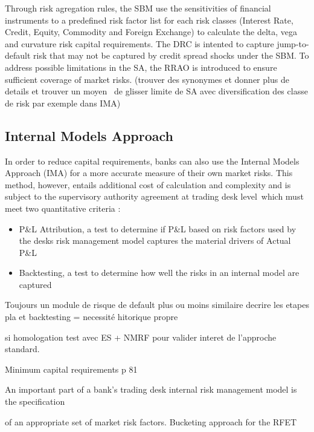\documentclass[3pt]{article}
\begin{document}
\bigskip

Through risk agregation rules, the SBM use the sensitivities of financial
instruments to a predefined risk factor list for each risk classes (Interest
Rate, Credit, Equity, Commodity and Foreign Exchange) to calculate the
delta, vega and curvature risk capital requirements. The DRC is intented to
capture jump-to-default risk that may not be captured by credit spread
shocks under the SBM. To address possible limitations in the SA, the RRAO is
introduced to ensure sufficient coverage of market risks. (trouver des
synonymes et donner plus de details et trouver un moyen \ de glisser limite
de SA avec diversification des classe de risk par exemple dans IMA)

\subsection{Internal Models Approach}

In order to reduce capital requirements, banks can also use the Internal
Models Approach (IMA) for a more accurate measure of their own market risks.
This method, however, entails additional cost of calculation and complexity
and is subject to the supervisory authority agreement at trading desk level\
which must meet two quantitative criteria :

\bigskip 

\begin{itemize}
\item P\&L Attribution, a test to determine if P\&L based on risk factors
used by the desks risk management model captures the material drivers of
Actual P\&L

\item Backtesting, a test to determine how well the risks in an internal
model are captured
\end{itemize}

\bigskip 

Toujours un module de risque de default plus ou moins similaire decrire les
etapes pla et backtesting =\TEXTsymbol{>} necessit\'{e} hitorique propre

si homologation test avec ES + NMRF pour valider interet de l'approche
standard.

\bigskip 

\bigskip Minimum capital requirements p 81

An important part of a bank's trading desk internal risk management model is
the specification

of an appropriate set of market risk factors. Bucketing approach for the RFET
\end{document}
